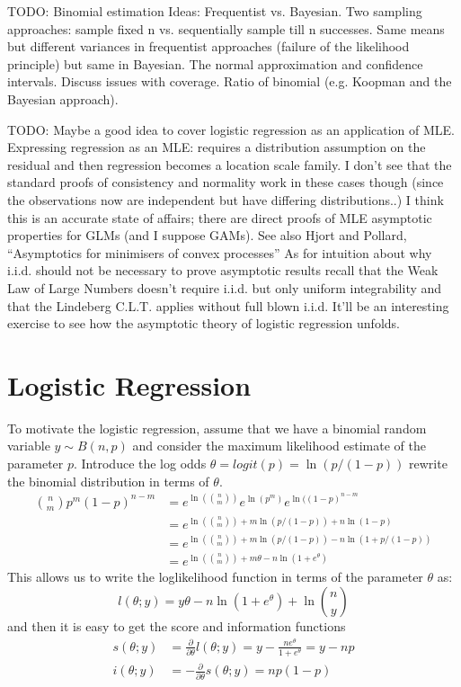 TODO: Binomial estimation
Ideas:  Frequentist vs. Bayesian.  Two sampling approaches: sample
fixed n vs. sequentially sample till n successes.  Same means but
different variances in frequentist approaches (failure of the
likelihood principle) but same in Bayesian.
The normal approximation and confidence intervals.  Discuss issues
with coverage.  Ratio of binomial (e.g. Koopman and the Bayesian approach).

TODO: Maybe a good idea to cover logistic regression as an application
of MLE.  Expressing regression as an MLE: requires a distribution
assumption on the residual and then regression becomes a location
scale family.  I don't see that the standard proofs of consistency and
normality work in these cases though (since the observations now are
independent but have differing distributions..)  I think this is an
accurate state of affairs; there are direct proofs of MLE asymptotic
properties for GLMs (and I suppose GAMs).  See also Hjort and Pollard,
``Asymptotics for minimisers of convex processes''  As for intuition
about why i.i.d. should not be necessary to prove asymptotic results
recall that the Weak Law of Large Numbers doesn't require i.i.d. but
only uniform integrability and that the Lindeberg C.L.T. applies
without full blown i.i.d.  It'll be an interesting exercise to see how
the asymptotic theory of logistic regression unfolds.

\section{Logistic Regression}
To motivate the logistic regression, assume that we have a binomial
random variable $y \sim B(n,p)$ and consider the maximum likelihood
estimate of the parameter $p$.  Introduce the log odds $\theta =
logit(p) = \ln(p/(1-p))$ rewrite the binomial
distribution in terms of $\theta$.
\begin{align}
\binom{n}{m}p^m(1-p)^{n-m} & = e^{\ln(\binom{n}{m})}
e^{\ln(p^m)}e^{\ln((1-p)^{n-m}} \\
& = e^{\ln(\binom{n}{m}) + m \ln(p/(1-p)) +
  n \ln(1-p)} \\
& = e^{\ln(\binom{n}{m}) + m \ln(p/(1-p)) -  n \ln(1 + p/(1-p))} \\
& = e ^ {\ln(\binom{n}{m}) + m \theta - n \ln(1+e^\theta)}
\end{align}
This allows us to write the loglikelihood function in terms of the
parameter $\theta$ as:
$$
l(\theta; y) = y\theta - n\ln(1+e^\theta) + \ln\binom{n}{y}
$$
and then it is easy to get the score and information functions
\begin{align}
s(\theta; y) & = \frac{\partial}{\partial \theta} l(\theta;y) = y -
\frac{n e^\theta}{1+e^\theta}= y - np \\
i(\theta; y) & = -\frac{\partial}{\partial \theta} s(\theta;y) = np(1-p)
\end{align}

